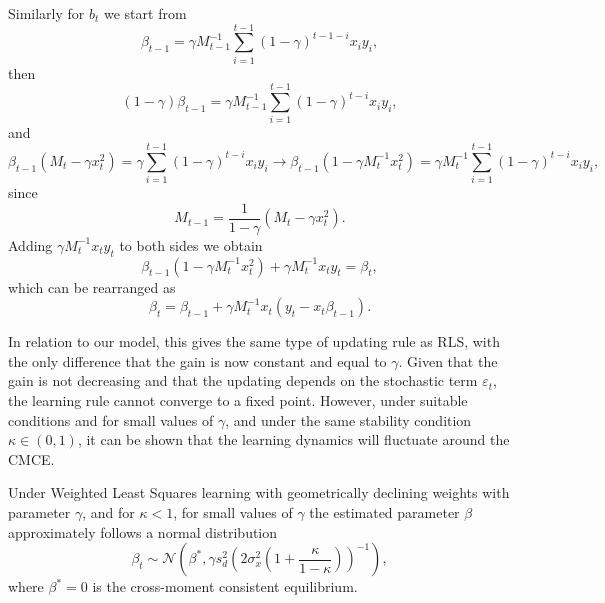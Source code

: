 \documentclass[11pt]{article}
\begin{document}
Similarly for $b_t$ we start from
\begin{equation}
    \beta_{t-1} = \gamma M^{-1}_{t-1} \sum^{t-1}_{i=1} {(1 - \gamma)^{t-1-i}} x_i y_i,
\end{equation}
then
\begin{equation}
    (1- \gamma) \beta_{t-1} = \gamma M^{-1}_{t-1} \sum^{t-1}_{i=1} {(1 - \gamma)^{t-i}} x_i y_i ,
\end{equation}
and
\begin{equation}
 \beta_{t-1} ( M_t - \gamma x_t^2) =  \gamma \sum^{t-1}_{i=1} {(1 - \gamma)^{t-i}} x_i y_i \rightarrow \beta_{t-1} (1 - \gamma M^{-1}_t x_t^2) = \gamma M^{-1}_t \sum^{t-1}_{i=1} {(1 - \gamma)^{t-i}} x_i y_i,
\end{equation}
since \[M_{t-1} = \frac{1}{1 - \gamma} (M_t - \gamma x_t^2).\]
Adding $\gamma M^{-1}_t x_t y_t$ to both sides we obtain
\begin{equation}
    \beta_{t-1} (1 - \gamma M^{-1}_t x_t^2) + \gamma M^{-1}_t x_t y_t = \beta_t,
\end{equation}
which can be rearranged as
\begin{equation}
    \beta_t = \beta_{t-1} + \gamma M^{-1}_t x_t (y_t - x_t \beta_{t-1}).
\end{equation}

In relation to our model, this gives the same type of updating rule as RLS, with the only difference that the gain is now constant and equal to $\gamma$.
Given that the gain is not decreasing and that the updating depends on the stochastic term $\varepsilon_t$, the learning rule cannot converge to a fixed point.
However, under suitable conditions and for small values of $\gamma$, and under the same stability condition $\kappa \in (0, 1)$, it can be shown that the learning dynamics will fluctuate around the CMCE.

\begin{proposition}
    Under Weighted Least Squares learning with geometrically declining weights with parameter $\gamma$, and for $\kappa < 1$, for small values of $\gamma$ the estimated parameter $\beta$ approximately follows a normal distribution
\begin{equation}
    \beta_t \sim \mathcal{N} \left(\beta^*, \gamma s_{d}^2 \left(2 \sigma^2_x \left(1 + \frac{\kappa}{1 - \kappa} \right)\right)^{-1}\right),
\end{equation}
where $\beta^* = 0$ is the cross-moment consistent equilibrium.
\end{proposition}
\end{document}
